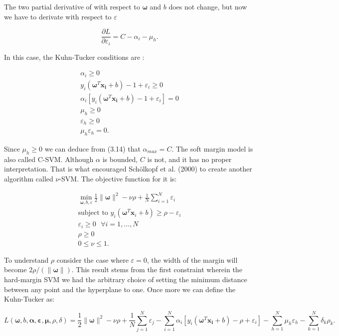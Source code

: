\documentclass[a4paper,12pt]{article}
\numberwithin{equation}{section}
\begin{document}
The two partial derivative of with respect to $ \boldsymbol{\omega} $ and $b$ does not change, but now we have to derivate with respect to $ \varepsilon $

\begin{equation}\label{eq:14}
 \frac{\partial L}{\partial{\varepsilon_i} } = C-\alpha_i - \mu_h.
\end{equation}

In this case, the Kuhn-Tucker conditions are :

\begin{align*}
  \alpha_i \geq 0 \\
  y_i(\boldsymbol{\omega}^T\boldsymbol{x_i}+b)-1 + \varepsilon_i \geq 0 \\
  \alpha_i[y_i(\boldsymbol{\omega}^T\boldsymbol{x_i}+b)-1 + \varepsilon_i] = 0 \\
  \mu_h \geq 0 \\
  \varepsilon_h \geq 0 \\
  \mu_h\varepsilon_h = 0.
\end{align*}


Since $\mu_h \geq 0$ we can deduce from (3.14) that $ \alpha_{max} = C $. The soft margin model is also called C-SVM. Although $\alpha$ is bounded, $C$ is not, and it has no proper interpretation. That is what encouraged Sch{\"o}lkopf et al. (2000) to create another algorithm called $\nu$-SVM. The objective function for it is:


\begin{align*}
  \min_{\boldsymbol{\omega},b,\varepsilon} \frac{1}{2}\|\boldsymbol{\omega}\|^2 - \nu\rho + \frac{1}{N}\sum_{i=1}^{N}\varepsilon_i \\
  \mbox{subject to } y_i(\boldsymbol{\omega}^T\boldsymbol{x}_i+b) \geq \rho -\varepsilon_i\\
  \varepsilon_i \geq 0 \mbox{ } \forall i = 1,\dots,N \\
  \rho \geq 0 \\
  0 \leq \nu  \leq 1.
\end{align*}{}

To understand $\rho$ consider the case where $\varepsilon = 0$, the width of the margin will become $2\rho/(\|\boldsymbol{\omega}\|)$. This result stems from the first constraint wherein the hard-margin SVM we had the arbitrary choice of setting the minimum distance between any point and the hyperplane to one. Once more we can define the Kuhn-Tucker as:

\begin{equation}\label{eq:15} 
 L(\boldsymbol{\omega},b,\boldsymbol{\alpha},\boldsymbol{\varepsilon},\boldsymbol{\mu},\rho,\delta)= \frac{1}{2}\|\boldsymbol{\omega}\|^2 - \nu\rho +\frac{1}{N}\sum_{j=1}^{N}\varepsilon_j- \sum_{i=1}^{N}\alpha_i[y_i(\boldsymbol{\omega}^T{\boldsymbol{x_i}}+b)-\rho+\varepsilon_i]-\sum_{h=1}^{N}\mu_h\varepsilon_h - \sum_{k=1}^{N}\delta_k\rho_k.
\end{equation}
\end{document}

